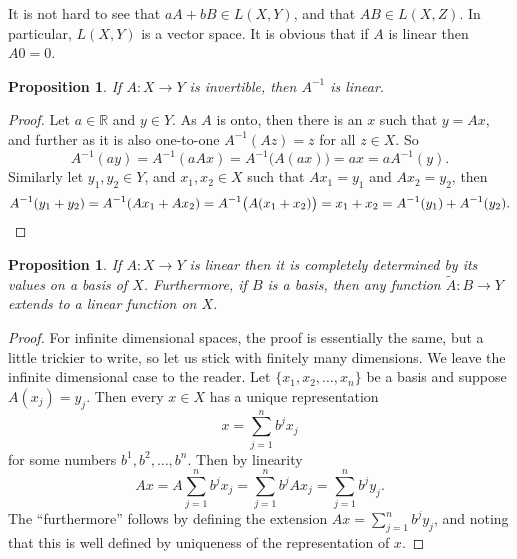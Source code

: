 \documentclass[12pt]{book}
\newcommand{\R}{{\mathbb{R}}}
\newcommand{\myindex}[1]{#1\index{#1}}
\theoremstyle{plain}
\newtheorem{prop}[thm]{Proposition}
\theoremstyle{remark}
\theoremstyle{definition}
\theoremstyle{exercise}
\theoremstyle{example}
\begin{document}
It is not hard to see that $aA+bB \in L(X,Y)$, and that $AB \in L(X,Z)$.
In particular, $L(X,Y)$ is a vector space.
%
It is obvious that if $A$ is linear then $A0 = 0$.

\begin{prop}
If $A \colon X \to Y$ is invertible, then $A^{-1}$ is linear.
\end{prop}

\begin{proof}
Let $a \in \R$ and $y \in Y$.  As $A$ is onto, then there is an 
$x$ such that $y = Ax$, and further as it is also one-to-one
$A^{-1}(Az) = z$ for all $z \in X$.  So
\begin{equation*}
A^{-1}(ay)
=
A^{-1}(aAx)
=
A^{-1}\bigl(A(ax)\bigr)
= ax
= aA^{-1}(y).
\end{equation*}
Similarly let $y_1,y_2 \in Y$, and $x_1, x_2 \in X$ such that
$Ax_1 = y_1$ and 
$Ax_2 = y_2$, then
\begin{equation*}
A^{-1}(y_1+y_2)
=
A^{-1}(Ax_1+Ax_2)
=
A^{-1}\bigl(A(x_1+x_2)\bigr)
= x_1+x_2
= A^{-1}(y_1) + A^{-1}(y_2). \qedhere
\end{equation*}
\end{proof}

\begin{prop}
If $A \colon X \to Y$ is linear then it is completely determined
by its values on a basis of $X$.  Furthermore, if $B$ is a basis,
then any function $\tilde{A} \colon B \to Y$ extends to a linear
function on $X$.
\end{prop}

\begin{proof}
For infinite dimensional spaces, the proof is essentially the same, but a
little trickier to write, so let us stick with finitely many dimensions.
We leave the infinite dimensional case to the reader.
Let $\{ x_1, x_2, \ldots, x_n \}$ be a basis and suppose 
$A(x_j) = y_j$.  Then every $x \in X$ has a unique representation
\begin{equation*}
x = \sum_{j=1}^n b^j x_j
\end{equation*}
for some numbers $b^1,b^2,\ldots,b^n$.  Then by linearity
\begin{equation*}
Ax = 
A\sum_{j=1}^n b^j x_j
=
\sum_{j=1}^n b^j Ax_j
=
\sum_{j=1}^n b^j y_j .
\end{equation*}
The ``furthermore'' follows by
defining the extension
$Ax = \sum_{j=1}^n b^j y_j$, and noting that this is well defined by
uniqueness of the representation of $x$.
\end{proof}
\end{document}
